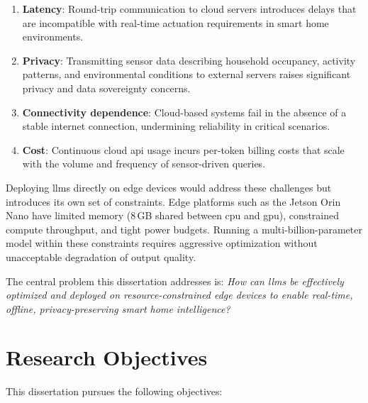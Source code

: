 \documentclass[12pt,a4paper,oneside]{report}
\begin{document}
\begin{enumerate}[label=(\roman*)]
    \item \textbf{Latency}: Round-trip communication to cloud servers introduces delays that are incompatible with real-time actuation requirements in smart home environments.
    \item \textbf{Privacy}: Transmitting sensor data describing household occupancy, activity patterns, and environmental conditions to external servers raises significant privacy and data sovereignty concerns.
    \item \textbf{Connectivity dependence}: Cloud-based systems fail in the absence of a stable internet connection, undermining reliability in critical scenarios.
    \item \textbf{Cost}: Continuous cloud \gls{api} usage incurs per-token billing costs that scale with the volume and frequency of sensor-driven queries.
\end{enumerate}

Deploying \glspl{llm} directly on edge devices would address these challenges but introduces its own set of constraints. Edge platforms such as the Jetson Orin Nano have limited memory (8\,GB shared between \gls{cpu} and \gls{gpu}), constrained compute throughput, and tight power budgets. Running a multi-billion-parameter model within these constraints requires aggressive optimization without unacceptable degradation of output quality.

The central problem this dissertation addresses is: \textit{How can \glspl{llm} be effectively optimized and deployed on resource-constrained edge devices to enable real-time, offline, privacy-preserving smart home intelligence?}


\section{Research Objectives}
\label{sec:intro-objectives}

This dissertation pursues the following objectives:
\end{document}

